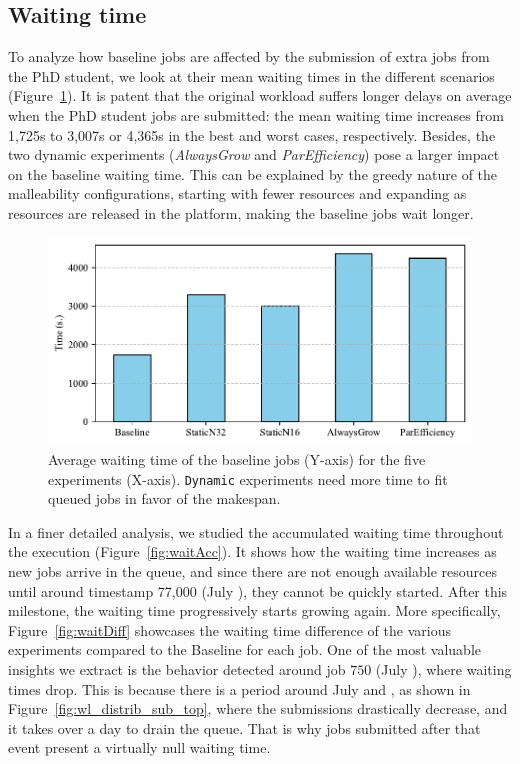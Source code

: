 \documentclass[a4paper,fleqn]{cas-dc}
\begin{document}
\subsection{Waiting time}\label{subsec:wt}
To analyze how baseline jobs are affected by the submission of extra jobs from the PhD student,
we look at their mean waiting times in the different scenarios (Figure~\ref{fig:baseline_waiting}).
It is patent that the original workload suffers longer delays on average when the PhD student jobs are submitted:
the mean waiting time increases from 1,725s to 3,007s or 4,365s in the best and worst cases, respectively.
Besides, the two dynamic experiments (\textit{AlwaysGrow} and \textit{ParEfficiency})
pose a larger impact on the baseline waiting time. 
This can be explained by the greedy nature of the malleability configurations,
starting with fewer resources and expanding as resources are released in the platform,
making the baseline jobs wait longer.

\begin{figure}[tbp]
        \centering
\includegraphics[clip,width=0.75\linewidth,trim={0.1cm 0.1cm 0.1cm 0.1cm}]{figures/base-waiting.pdf}
        \caption{Average waiting time of the baseline jobs (Y-axis) for the five experiments (X-axis). \texttt{Dynamic} experiments need more time to fit queued jobs in favor of the makespan.}
        \label{fig:baseline_waiting}
\end{figure}

In a finer detailed analysis, we studied the accumulated waiting time throughout the execution (Figure~\ref{fig:waitAcc}).
It shows how the waiting time increases as new jobs arrive in the queue, and since there are not enough available resources until around timestamp 77,000 (July ), they cannot be quickly started.
After this milestone, the waiting time progressively starts growing again. 
More specifically, Figure~\ref{fig:waitDiff} showcases the waiting time difference of the various experiments compared to the Baseline for each job.
One of the most valuable insights we extract is the behavior detected around job $750$ (July ), where waiting times drop.
This is because there is a period around July  and , as shown in Figure~\ref{fig:wl_distrib_sub_top}, where the submissions drastically decrease, and it takes over a day to drain the queue.
That is why jobs submitted after that event present a virtually null waiting time.
\end{document}
